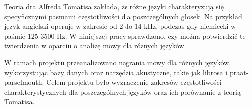 Teoria dra Alfreda Tomatisa zakłada, że różne języki charakteryzują się specyficznymi pasmami częstotliwości dla poszczególnych głosek. Na przykład język angielski operuje w zakresie od 2 do 14 kHz, podczas gdy niemiecki w paśmie 125-3500 Hz. W niniejszej pracy sprawdzono, czy można potwierdzić te twierdzenia w oparciu o analizę mowy dla różnych języków.

W ramach projektu przeanalizowano nagrania mowy dla różnych języków, wykorzystując bazy danych oraz narzędzia akustyczne, takie jak librosa i praat-parselmouth. Celem projektu było wyznaczenie zakresów częstotliwości charakterystycznych dla poszczególnych języków oraz ich porównanie z teorią Tomatisa.
